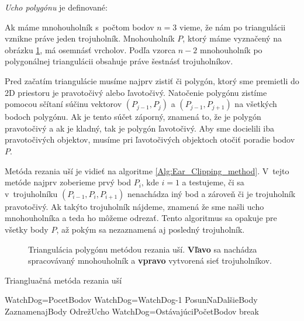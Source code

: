 \textit{Ucho polygónu} je definované: \cite{ear}

\cite{Berg:2008:CGA:1370949} Ak máme mnohouholník s~počtom bodov $n=3$ vieme, že nám po triangulácii vznikne práve jeden trojuholník. Mnohouholník $P$, ktorý máme vyznačený na obrázku \ref{fig:triangluacia}, má osemnásť vrcholov. Podľa vzorca $n-2$ mnohouholník po polygonálnej triangulácii obsahuje práve šestnásť trojuholníkov.



Pred začatím triangulácie musíme najprv zistiť či polygón, ktorý sme premietli do 2D priestoru je pravotočivý alebo ľavotočivý. Natočenie polygónu zistíme pomocou sčítaní súčinu vektorov $(P_{j-1}, P_{j})$ a $(P_{j-1}, P_{j + 1})$ na všetkých bodoch polygónu. Ak je tento súčet záporný, znamená to, že je polygón pravotočivý a ak je kladný, tak je polygón ľavotočivý. Aby sme docielili iba pravotočivých objektov, musíme pri ľavotočivých objektoch otočiť poradie bodov $P$.

Metóda rezania uší je vidieť na algoritme \ref{Alg:Ear_Clipping_method}. V~tejto metóde najprv zoberieme prvý bod $P_{i}\text{, kde }i=1$ a testujeme, či sa v~trojuholníku $(P_{i-1},P_{i},P_{i + 1})$ nenachádza iný bod a zároveň či je trojuholník pravotočivý. Ak takýto trojuholník nájdeme, znamená že sme našli ucho mnohouholníka a teda ho môžeme odrezať. Tento algoritmus sa opakuje pre všetky body $P$, až pokým sa nezaznamená aj posledný trojuholník.
\begin{figure}[!h]
\centering
{}\quad
{}
\caption{Triangulácia polygónu metódou rezania uší. \textbf{Vľavo} sa nachádza spracovávaný mnohouholník a \textbf{vpravo} vytvorená sieť trojuholníkov.}\label{fig:triangluacia}
\end{figure}

\begin{algorithm}[H]
\caption{Triangluačná metóda rezania uší}\label{Alg:Ear_Clipping_method}
\begin{algorithmic}[1]
\State WatchDog=PocetBodov
	\State WatchDog=WatchDog-1
    \State PosunNaDalšieBody
    \State ZaznamenajBody
    \State OdrežUcho
    \State WatchDog=OstávajúciPočetBodov
  \EndIf
  	\State break
  \EndIf
\EndWhile
\EndFunction
\end{algorithmic}
\end{algorithm}

